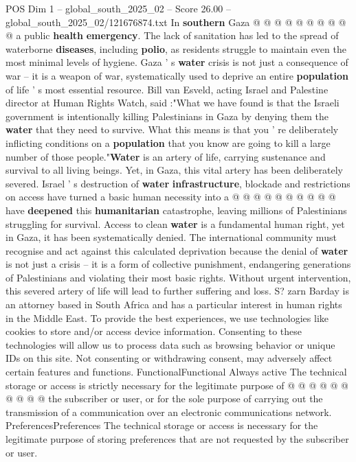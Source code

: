 \begin{textsample}{POS Dim 1 – global\_south\_2025\_02 – Score 26.00 – global\_south\_2025\_02/121676874.txt}
In \textbf{southern} Gaza @ @ @ @ @ @ @ @ @ @ a public \textbf{health} \textbf{emergency}.
The lack of sanitation has led to the spread of waterborne \textbf{diseases}, including \textbf{polio}, as residents struggle to maintain even the most minimal levels of hygiene.
Gaza ' s \textbf{water} crisis is not just a consequence of war -- it is a weapon of war, systematically used to deprive an entire \textbf{population} of life ' s most essential resource.
Bill van Esveld, acting Israel and Palestine director at Human Rights Watch, said :"What we have found is that the Israeli government is intentionally killing Palestinians in Gaza by denying them the \textbf{water} that they need to survive.
What this means is that you ' re deliberately inflicting conditions on a \textbf{population} that you know are going to kill a large number of those people."\textbf{Water} is an artery of life, carrying sustenance and survival to all living beings.
Yet, in Gaza, this vital artery has been deliberately severed.
Israel ' s destruction of \textbf{water} \textbf{infrastructure}, blockade and restrictions on access have turned a basic human necessity into a @ @ @ @ @ @ @ @ @ @ have \textbf{deepened} this \textbf{humanitarian} catastrophe, leaving millions of Palestinians struggling for survival.
Access to clean \textbf{water} is a fundamental human right, yet in Gaza, it has been systematically denied.
The international community must recognise and act against this calculated deprivation because the denial of \textbf{water} is not just a crisis -- it is a form of collective punishment, endangering generations of Palestinians and violating their most basic rights.
Without urgent intervention, this severed artery of life will lead to further suffering and loss.
S? zarn Barday is an attorney based in South Africa and has a particular interest in human rights in the Middle East.
To provide the best experiences, we use technologies like cookies to store and/or access device information.
Consenting to these technologies will allow us to process data such as browsing behavior or unique IDs on this site.
Not consenting or withdrawing consent, may adversely affect certain features and functions.
FunctionalFunctional Always active The technical storage or access is strictly necessary for the legitimate purpose of @ @ @ @ @ @ @ @ @ @ the subscriber or user, or for the sole purpose of carrying out the transmission of a communication over an electronic communications network.
PreferencesPreferences The technical storage or access is necessary for the legitimate purpose of storing preferences that are not requested by the subscriber or user.

\end{textsample}
